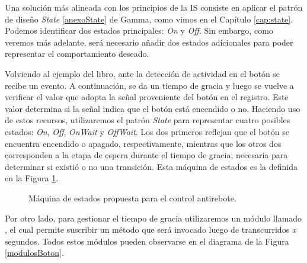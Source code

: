 Una solución más alineada con los principios de la \gls{IS} consiste en aplicar el patrón de diseño \textit{State} \ref{anexoState} de Gamma, como vimos en el Capítulo \ref{cap:state}. Podemos identificar dos estados principales: \textit{On} y \textit{Off}. Sin embargo, como veremos más adelante, será necesario añadir dos estados adicionales para poder representar el comportamiento deseado.

Volviendo al ejemplo del libro, ante la detección de actividad en el botón se recibe un evento. A continuación, se da un tiempo de gracia y luego se vuelve a verificar el valor que adopta la señal proveniente del botón en el registro. Este valor determina si la señal indica que el botón está encendido o no. Haciendo uso de estos recursos, utilizaremos el patrón \textit{State} para representar cuatro posibles estados: \textit{On}, \textit{Off}, \textit{OnWait} y \textit{OffWait}. Los dos primeros reflejan que el botón se encuentra encendido o apagado, respectivamente, mientras que los otros dos corresponden a la etapa de espera durante el tiempo de gracia, necesaria para determinar si existió o no una transición. Esta máquina de estados es la definida en la Figura \ref{maquinaBoton}.

\begin{figure}[H]
\caption{Máquina de estados propuesta para el control antirebote.}
\label{maquinaBoton}
\begin{center}
\end{center}
\end{figure}


Por otro lado, para gestionar el tiempo de gracia utilizaremos un módulo llamado \Temporizador, el cual permite suscribir un método que será invocado luego de transcurridos \textit{x} segundos. Todos estos módulos pueden observarse en el diagrama de la Figura \ref{modulosBoton}.


